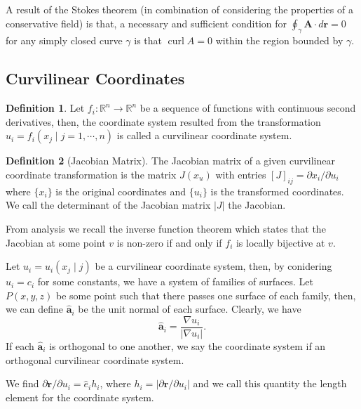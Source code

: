 \documentclass[
]{article}
\theoremstyle{definition}
\theoremstyle{definition}
\newtheorem{definition}{Definition}[section]
\begin{document}
A result of the Stokes theorem (in combination of considering the
properties of a conservative field) is that, a necessary and sufficient
condition for \(\oint_\gamma \mathbf{A} \cdot d\mathbf{r} = 0\) for any
simply closed curve \(\gamma\) is that \(\mathop{\mathrm{curl}}A = 0\)
within the region bounded by \(\gamma\).

\hypertarget{curvilinear-coordinates}{%
\subsection{Curvilinear Coordinates}\label{curvilinear-coordinates}}

\begin{definition}
  Let \(f_i : \mathbb{R}^n \to \mathbb{R}^n\) be a sequence of functions with 
  continuous second derivatives, then, the coordinate system resulted from the 
  transformation \(u_i = f_i(x_j \mid j = 1, \cdots, n)\) is called a curvilinear 
  coordinate system.
\end{definition}

\begin{definition}[Jacobian Matrix]
  The Jacobian matrix of a given curvilinear coordinate transformation is the matrix 
  \(J(x_u)\) with entries \([J]_{ij} = \partial x_i / \partial u_i\) where \(\{x_i\}\) 
  is the original coordinates and \(\{u_i\}\) is the transformed coordinates. 
  We call the determinant of the Jacobian matrix \(\left| J \right|\) the Jacobian.
\end{definition}

From analysis we recall the inverse function theorem which states that
the Jacobian at some point \(v\) is non-zero if and only if \(f_i\) is
locally bijective at \(v\).

Let \(u_i = u_i(x_j \mid j)\) be a curvilinear coordinate system, then,
by conidering \(u_i = c_i\) for some constants, we have a system of
families of surfaces. Let \(P(x, y, z)\) be some point such that there
passes one surface of each family, then, we can define
\(\hat{\mathbf{a}}_i\) be the unit normal of each surface. Clearly, we
have
\[\hat{\mathbf{a}}_i = \frac{\nabla u_i}{\left| \nabla u_i \right|}.\]
If each \(\hat{\mathbf{a}}_i\) is orthogonal to one another, we say the
coordinate system if an orthogonal curvilinear coordinate system.

We find \(\partial \mathbf{r} / \partial u_i = \hat{e}_i h_i\), where
\(h_i = \left| \partial \mathbf{r} / \partial u_i\right|\) and we call
this quantity the length element for the coordinate system.
\end{document}

